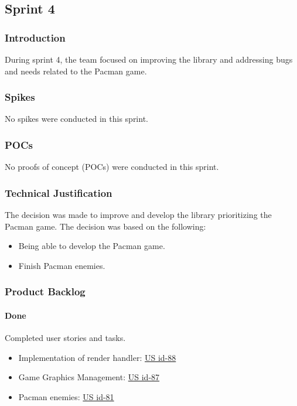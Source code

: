 \subsection{Sprint 4}

\subsubsection{Introduction}
During sprint 4, the team focused on improving the library and addressing bugs and needs related to the Pacman game.

\subsubsection{Spikes}

No spikes were conducted in this sprint.

\subsubsection{POCs}

No proofs of concept (POCs) were conducted in this sprint.

\subsubsection{Technical Justification}
The decision was made to improve and develop the library prioritizing the Pacman game. The decision was based on the following:

\begin{itemize}
    \item Being able to develop the Pacman game.
    \item Finish Pacman enemies.
\end{itemize}

\newpage

\subsubsection{Product Backlog}

\paragraph{Done}
Completed user stories and tasks.

\begin{itemize}
    \item Implementation of render handler: \href{https://tree.taiga.io/project/joseluis-teran-coffeetime/us/88?milestone=394885}{US id-88}
    \item Game Graphics Management: \href{https://tree.taiga.io/project/joseluis-teran-coffeetime/us/87?milestone=394885}{US id-87}
    \item Pacman enemies: \href{https://tree.taiga.io/project/joseluis-teran-coffeetime/us/81?milestone=394885}{US id-81}
\end{itemize}

